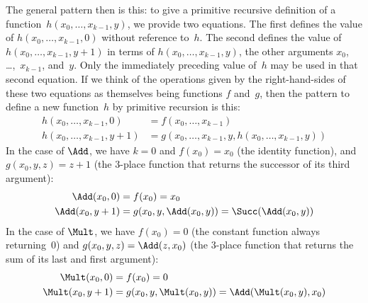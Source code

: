 \documentclass[../../../include/open-logic-section]{subfiles}
\begin{document}
The general pattern then is this: to give a primitive recursive
definition of a function~$h(x_0, \dots, x_{k-1}, y)$, we provide two
equations. The first defines the value of $h(x_0, \dots, x_{k-1}, 0)$
without reference to~$h$. The second defines the value of $h(x_0,
\dots, x_{k-1}, y+1)$ in terms of $h(x_0, \dots, x_{k-1}, y)$, the other
arguments $x_0$, \dots,~$x_{k-1}$, and~$y$. Only the immediately preceding
value of~$h$ may be used in that second equation.  If we think of the
operations given by the right-hand-sides of these two equations as
themselves being functions $f$ and~$g$, then the pattern to define a
new function~$h$ by primitive recursion is this:
\begin{align*}
  h(x_0, \dots, x_{k-1}, 0) & = f(x_0, \dots, x_{k-1})\\
  h(x_0, \dots, x_{k-1}, y+1) & =
  g(x_0, \dots, x_{k-1}, y, h(x_0, \dots, x_{k-1}, y))
\end{align*}  
In the case of $\Add$, we have $k=0$ and $f(x_0) = x_0$ (the
identity function), and $g(x_0, y, z) = z + 1$ (the $3$-place function
that returns the successor of its third argument):
\begin{align*}
  \Add(x_0, 0) & = f(x_0) = x_0\\
  \Add(x_0, y+1) & = g(x_0, y, \Add(x_0, y)) =
  \Succ(\Add(x_0, y))
\end{align*}
In the case of $\Mult$, we have $f(x_0) = 0$ (the constant
function always returning~$0$) and $g(x_0, y, z) = \Add(z,x_0)$
(the $3$-place function that returns the sum of its last and first
argument):
\begin{align*}
  \Mult(x_0,0) & =  f(x_0) = 0 \\
  \Mult(x_0,y+1) & =  g(x_0, y, \Mult(x_0,y)) =
  \Add(\Mult(x_0,y), x_0)
\end{align*}
\end{document}
